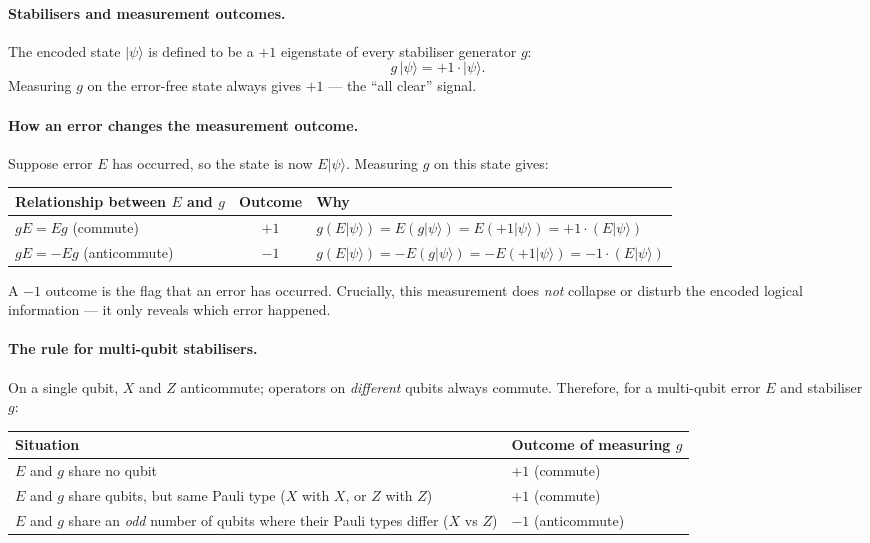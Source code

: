 \documentclass[11pt, a4paper]{article}
\theoremstyle{definition}
\theoremstyle{plain}
\theoremstyle{remark}
\begin{document}
\paragraph{Stabilisers and measurement outcomes.}
The encoded state $|\psi\rangle$ is defined to be a $+1$ eigenstate
of every stabiliser generator $g$:
\[
  g\,|\psi\rangle = +1\cdot|\psi\rangle.
\]
Measuring $g$ on the error-free state always gives $+1$ --- the
``all clear'' signal.

\paragraph{How an error changes the measurement outcome.}
Suppose error $E$ has occurred, so the state is now $E|\psi\rangle$.
Measuring $g$ on this state gives:
\begin{center}
\renewcommand{\arraystretch}{1.5}
\begin{tabular}{@{} l c l @{}}
  \toprule
  \textbf{Relationship between $E$ and $g$}
    & \textbf{Outcome} & \textbf{Why}\\
  \midrule
  $gE = Eg$ \quad (commute)
    & $+1$
    & $g(E|\psi\rangle) = E(g|\psi\rangle) = E(+1|\psi\rangle)
      = +1\cdot(E|\psi\rangle)$\\[4pt]
  $gE = -Eg$ \quad (anticommute)
    & $-1$
    & $g(E|\psi\rangle) = -E(g|\psi\rangle) = -E(+1|\psi\rangle)
      = -1\cdot(E|\psi\rangle)$\\
  \bottomrule
\end{tabular}
\end{center}

\medskip\noindent
A $-1$ outcome is the flag that an error has occurred.  Crucially,
this measurement does \emph{not} collapse or disturb the encoded
logical information --- it only reveals which error happened.

\paragraph{The rule for multi-qubit stabilisers.}
On a single qubit, $X$ and $Z$ anticommute; operators on
\emph{different} qubits always commute.  Therefore, for a multi-qubit
error $E$ and stabiliser $g$:

\begin{center}
\renewcommand{\arraystretch}{1.4}
\begin{tabular}{@{} p{6cm} l @{}}
  \toprule
  \textbf{Situation} & \textbf{Outcome of measuring $g$}\\
  \midrule
  $E$ and $g$ share no qubit
    & $+1$ (commute)\\
  $E$ and $g$ share qubits, but same Pauli type ($X$ with $X$, or $Z$ with $Z$)
    & $+1$ (commute)\\
  $E$ and $g$ share an \emph{odd} number of qubits where their Pauli
  types differ ($X$ vs $Z$)
    & $-1$ (anticommute)\\
  \bottomrule
\end{tabular}
\end{center}
\end{document}
